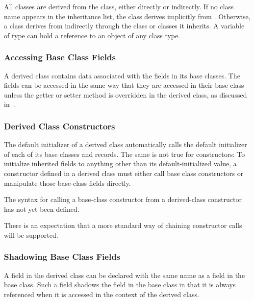 All classes are derived from the  class, either directly or
indirectly.  If no class name appears in the inheritance list, the class derives
implicitly from .  Otherwise, a class derives from 
indirectly through the class or classes it inherits.  A variable of type 
can hold a reference to an object of any class type. 

\subsubsection{Accessing Base Class Fields}
\label{Accessing_Base_Class_Fields}

A derived class contains data associated with the fields in its base
classes.  The fields can be accessed in the same way that they are
accessed in their base class unless the getter or setter method is
overridden in the derived class, as discussed
in~.

\subsubsection{Derived Class Constructors}
\label{Derived_Class_Constructors}

The default initializer of a derived class automatically calls the default
initializer of each of its base classes and records.  The same is not true for constructors:
To initialize inherited fields to anything other than its default-initialized
value, a constructor defined in a derived class must either call base class
constructors or manipulate those base-class fields directly.

\begin{openissue}
The syntax for calling a base-class constructor from a derived-class constructor
has not yet been defined.

There is an expectation that a more standard way
of chaining constructor calls will be supported.
\end{openissue}

\subsubsection{Shadowing Base Class Fields}
\label{Shadowing_Base_Class_Fields}

A field in the derived class can be declared with the same name as a
field in the base class.  Such a field shadows the field in the base
class in that it is always referenced when it is accessed in the
context of the derived class.  

